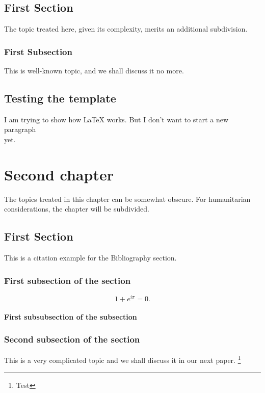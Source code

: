 \documentclass[hidelinks,pdftex,phd]{pittetd}
\begin{document}
\section{First Section}
The topic treated here, given its complexity, merits an additional subdivision.


\subsection{First Subsection}
This is well-known topic, and we shall discuss it no more.
\section{Testing the template}
I am trying to show how LaTeX works.
But I don't want to start a new paragraph \\ yet.
\cite{DUMMY:1}


\chapter{Second chapter}
The topics treated in this chapter can be somewhat obscure. For humanitarian considerations, the chapter will be subdivided.
\section{First Section}
This is a citation example for the Bibliography section.\cite{DUMMY:2}


\subsection{First subsection of the section}

\begin{equation} \label{EQ1}
     1 + e^{i \pi} = 0.
\end{equation}
\subsubsection{First subsubsection of the subsection}
\subsection{Second subsection of the section}
This is a very complicated topic and we shall discuss it in our next paper.\cite{DUMMY:11}
\footnote{Test}
\end{document}
